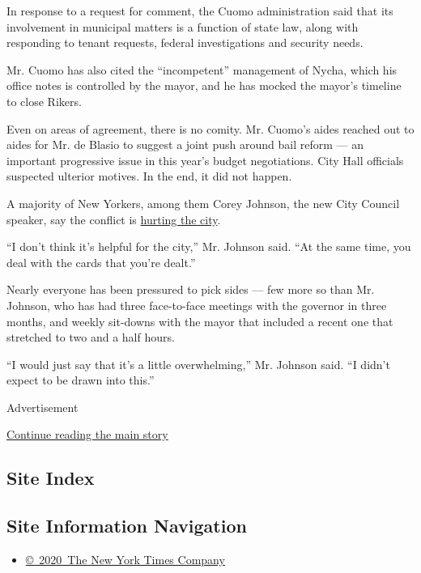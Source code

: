 In response to a request for comment, the Cuomo administration said that
its involvement in municipal matters is a function of state law, along
with responding to tenant requests, federal investigations and security
needs.

Mr. Cuomo has also cited the ``incompetent'' management of Nycha, which
his office notes is controlled by the mayor, and he has mocked the
mayor's timeline to close Rikers.

Even on areas of agreement, there is no comity. Mr. Cuomo's aides
reached out to aides for Mr. de Blasio to suggest a joint push around
bail reform --- an important progressive issue in this year's budget
negotiations. City Hall officials suspected ulterior motives. In the
end, it did not happen.

A majority of New Yorkers, among them Corey Johnson, the new City
Council speaker, say the conflict is
\href{https://twitter.com/QuinnipiacPoll/status/916408472287158272}{hurting
the city}.

``I don't think it's helpful for the city,'' Mr. Johnson said. ``At the
same time, you deal with the cards that you're dealt.''

Nearly everyone has been pressured to pick sides --- few more so than
Mr. Johnson, who has had three face-to-face meetings with the governor
in three months, and weekly sit-downs with the mayor that included a
recent one that stretched to two and a half hours.

``I would just say that it's a little overwhelming,'' Mr. Johnson said.
``I didn't expect to be drawn into this.''

Advertisement

\protect\hyperlink{after-bottom}{Continue reading the main story}

\hypertarget{site-index}{%
\subsection{Site Index}\label{site-index}}

\hypertarget{site-information-navigation}{%
\subsection{Site Information
Navigation}\label{site-information-navigation}}

\begin{itemize}
\tightlist
\item
  \href{https://help.nytimes3xbfgragh.onion/hc/en-us/articles/115014792127-Copyright-notice}{©~2020~The
  New York Times Company}
\end{itemize}

